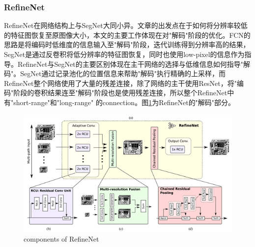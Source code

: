 \documentclass{article}
\begin{document}
\begin{CJK}{UTF8}{gbsn}
\subsubsection{RefineNet}
RefineNet\cite{lin2017refinenet}在网络结构上与SegNet\cite{badrinarayanan2017segnet}大同小异。文章的出发点在于如何将分辨率较低的特征图恢复至原图像大小，本文的主要工作体现在对"解码"阶段的优化。FCN\cite{long2015fully}的思路是将编码时低维度的信息输入至"解码"阶段，迭代训练得到分辨率高的结果，SegNet\cite{badrinarayanan2017segnet}是通过反卷积将低分辨率的特征图恢复，同时也使用low-pixel的信息作为指导。RefineNet\cite{lin2017refinenet}与SegNet\cite{badrinarayanan2017segnet}的主要区别体现在主干网络的选择与低维信息如何指导"解码"。SegNet\cite{badrinarayanan2017segnet}通过记录池化的位置信息来帮助"解码"执行精确的上采样，而RefineNet\cite{lin2017refinenet}整个网络使用了大量的残差连接，除了网络的主干使用ResNet\cite{he2016deep}，将"编码"阶段的卷积结果连至"解码"阶段也是使用残差连接，所以整个RefineNet\cite{lin2017refinenet}中有"short-range"和"long-range" 的connection。图\ref{RefineNet}为RefineNet\cite{lin2017refinenet}的"解码"部分。
\begin{figure}[h]
    \centering
    \includegraphics[scale=0.6]{imgs/2-4_components_of_RefineNet.png}
    \caption{components of RefineNet}
    \label{RefineNet}
\end{figure}


\end{CJK}
\end{document}
